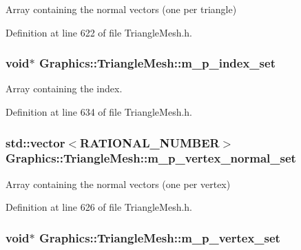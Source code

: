 Array containing the normal vectors (one per triangle) 



Definition at line 622 of file TriangleMesh.h.

\hypertarget{class_graphics_1_1_triangle_mesh_a41ed5fe89584f78a2798e663dd215ce5}{
\subsubsection[{m\_\-p\_\-index\_\-set}]{\setlength{\rightskip}{0pt plus 5cm}void$\ast$ {\bf Graphics::TriangleMesh::m\_\-p\_\-index\_\-set}}}
\label{class_graphics_1_1_triangle_mesh_a41ed5fe89584f78a2798e663dd215ce5}


Array containing the index. 



Definition at line 634 of file TriangleMesh.h.

\hypertarget{class_graphics_1_1_triangle_mesh_acd89938378236b129fc2f3700103084b}{
\subsubsection[{m\_\-p\_\-vertex\_\-normal\_\-set}]{\setlength{\rightskip}{0pt plus 5cm}std::vector$<${\bf RATIONAL\_\-NUMBER}$>$ {\bf Graphics::TriangleMesh::m\_\-p\_\-vertex\_\-normal\_\-set}}}
\label{class_graphics_1_1_triangle_mesh_acd89938378236b129fc2f3700103084b}


Array containing the normal vectors (one per vertex) 



Definition at line 626 of file TriangleMesh.h.

\hypertarget{class_graphics_1_1_triangle_mesh_af59f4953488d1e569ae0fb9d4a03aaff}{
\subsubsection[{m\_\-p\_\-vertex\_\-set}]{\setlength{\rightskip}{0pt plus 5cm}void$\ast$ {\bf Graphics::TriangleMesh::m\_\-p\_\-vertex\_\-set}}}
\label{class_graphics_1_1_triangle_mesh_af59f4953488d1e569ae0fb9d4a03aaff}


